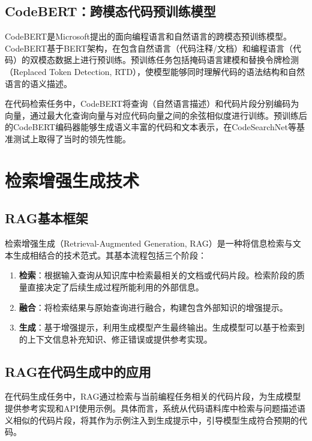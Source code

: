 \documentclass[
    fontset = win, %
  ]{njuthesis}
\begin{document}
\subsection{CodeBERT：跨模态代码预训练模型}

CodeBERT\cite{codebert2020}是Microsoft提出的面向编程语言和自然语言的跨模态预训练模型。CodeBERT基于BERT架构，在包含自然语言（代码注释/文档）和编程语言（代码）的双模态数据上进行预训练。预训练任务包括掩码语言建模和替换令牌检测（Replaced Token Detection, RTD），使模型能够同时理解代码的语法结构和自然语言的语义描述。

在代码检索任务中，CodeBERT将查询（自然语言描述）和代码片段分别编码为向量，通过最大化查询向量与对应代码向量之间的余弦相似度进行训练。预训练后的CodeBERT编码器能够生成语义丰富的代码和文本表示，在CodeSearchNet\cite{codesearchnet2019}等基准测试上取得了当时的领先性能。

\section{检索增强生成技术}

\subsection{RAG基本框架}

检索增强生成\cite{rag2020}（Retrieval-Augmented Generation, RAG）是一种将信息检索与文本生成相结合的技术范式。其基本流程包括三个阶段：

\begin{enumerate}
    \item \textbf{检索}：根据输入查询从知识库中检索最相关的文档或代码片段。检索阶段的质量直接决定了后续生成过程所能利用的外部信息。
    \item \textbf{融合}：将检索结果与原始查询进行融合，构建包含外部知识的增强提示。
    \item \textbf{生成}：基于增强提示，利用生成模型产生最终输出。生成模型可以基于检索到的上下文信息补充知识、修正错误或提供参考实现。
\end{enumerate}

\subsection{RAG在代码生成中的应用}

在代码生成任务中，RAG通过检索与当前编程任务相关的代码片段，为生成模型提供参考实现和API使用示例。具体而言，系统从代码语料库中检索与问题描述语义相似的代码片段，将其作为示例注入到生成提示中，引导模型生成符合预期的代码。
\end{document}
